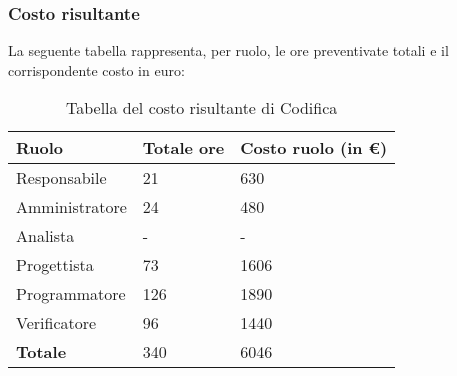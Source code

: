 \begin{comment}
\subsubsection{Ore e costi degli incrementi}
La seguente tabella rappresenta la distribuzione delle ore investite durante il periodo in cui vengono svolti gli incrementi e il corrispondente costo in euro.


{
\rowcolors{2}{\evenRowColor}{\oddRowColor}
\renewcommand{\arraystretch}{1.65}
\centering
\begin{longtable}{ C{2.1cm} C{2.7cm} C{3cm} C{3cm} C{3.3cm} }
\caption{Tabella del costo risultante di ogni incremento}\\
\rowcolor{\primaryColor}
\textcolor{\secondaryColor}{\textbf{Incremento}} & 
\textcolor{\secondaryColor}{\textbf{Ore progettista}} &
\textcolor{\secondaryColor}{\textbf{Ore programmatore}}&
\textcolor{\secondaryColor}{\textbf{Ore verificatore}}&
\textcolor{\secondaryColor}{\textbf{Costo totale incremento (in \euro{})}}\\
\endhead


x & x & x & x & x\\
x & x & x & x & x\\
x & x & x & x & x\\
x & x & x & x & x\\
x & x & x & x & x\\



\end{longtable}
}

\end{comment}

\subsubsection{Costo risultante}
La seguente tabella rappresenta, per ruolo, le ore preventivate totali e il corrispondente costo in euro:
{
\renewcommand{\arraystretch}{2}
\begin{longtable}{ C{3cm} C{2cm} C{4cm}}
\caption{Tabella del costo risultante di Codifica}\\
\rowcolor{\primaryColor}

\textcolor{\secondaryColor}{\textbf{Ruolo}} & 
\textcolor{\secondaryColor}{\textbf{Totale ore}} & 
\textcolor{\secondaryColor}{\textbf{Costo ruolo (in \euro{})}}\\	
\endhead
        
Responsabile    & 21 & 630 \\
Amministratore  & 24 & 480 \\
Analista        & - & - \\
Progettista     & 73 & 1606 \\
Programmatore   & 126 & 1890 \\
Verificatore    & 96 & 1440 \\
\textbf{Totale} & 340 & 6046 \\
		
\end{longtable}
}


